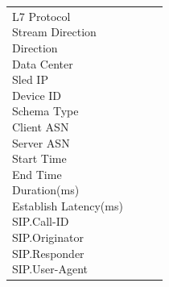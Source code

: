 \begin{description}
\begin{longtable}{p{}|p{}|p{}|p{}}
{                                                                                                    L7 Protocol\\
                                                                                                    Stream Direction\\
                                                                                                    Direction\\
                                                                                                    Data Center\\
                                                                                                    Sled IP\\
                                                                                                    Device ID\\
                                                                                                    Schema Type\\
                                                                                                    Client ASN\\
                                                                                                    Server ASN\\
                                                                                                    Start Time\\
                                                                                                    End Time\\
                                                                                                    Duration(ms)\\
                                                                                                    Establish Latency(ms)\\
                                                                                                    SIP.Call-ID\\
                                                                                                    SIP.Originator\\
                                                                                                    SIP.Responder\\
                                                                                                    SIP.User-Agent\\
}
\end{longtable}
\end{description}
